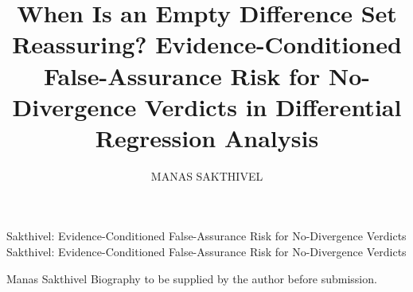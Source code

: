 \documentclass{ieeeaccess}
\begin{document}

\title{When Is an Empty Difference Set Reassuring? Evidence-Conditioned False-Assurance Risk for No-Divergence Verdicts in Differential Regression Analysis}

\author{\uppercase{Manas Sakthivel}}
\address[1]{Affiliation and e-mail to be supplied by the author before submission}


\markboth
{Sakthivel: Evidence-Conditioned False-Assurance Risk for No-Divergence Verdicts}
{Sakthivel: Evidence-Conditioned False-Assurance Risk for No-Divergence Verdicts}


\begin{abstract}

\end{abstract}

\begin{keywords}

\end{keywords}

\titlepgskip=-21pt

\maketitle

















\begin{IEEEbiographynophoto}{Manas Sakthivel}
Biography to be supplied by the author before submission.
\end{IEEEbiographynophoto}

\EOD
\end{document}

